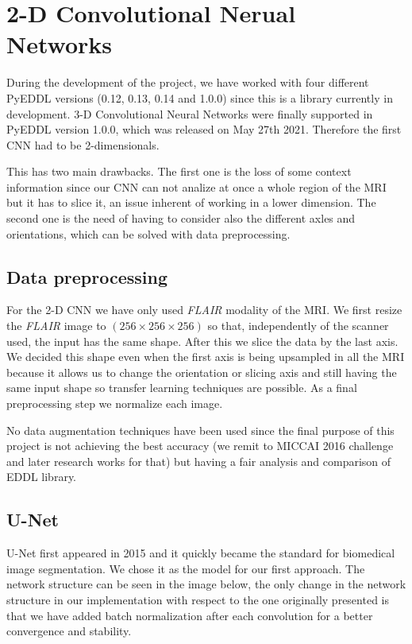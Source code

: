 \chapter{2-D Convolutional Nerual Networks}
\label{3.2D_CNN}

During the development of the project, we have worked with four different PyEDDL versions (0.12, 0.13, 0.14 and 1.0.0) since this is a library currently in development. 3-D Convolutional Neural Networks were finally supported in PyEDDL version 1.0.0, which was released on May 27th 2021. Therefore the first CNN had to be 2-dimensionals.

This has two main drawbacks. The first one is the loss of some context information since our CNN can not analize at once a whole region of the MRI but it has to slice it, an issue inherent of working in a lower dimension. The second one is the need of having to consider also the different axles and orientations, which can be solved with data preprocessing.

\section{Data preprocessing}

For the 2-D CNN we have only used \textit{FLAIR} modality of the MRI. We first resize the \textit{FLAIR} image to $(256\times256\times256)$ so that, independently of the scanner used, the input has the same shape. After this we slice the data by the last axis. We decided this shape even when the first axis is being upsampled in all the MRI because it allows us to change the orientation or slicing axis and still having the same input shape so transfer learning techniques are possible. As a final preprocessing step we normalize each image.

No data augmentation techniques have been used since the final purpose of this project is not achieving the best accuracy (we remit to MICCAI 2016 challenge and later research works for that) but having a fair analysis and comparison of EDDL library.


\newpage
\section{U-Net}

U-Net \cite{UNET:2015} first appeared in 2015 and it quickly became the standard for biomedical image segmentation. We chose it as the model for our first approach. The network structure can be seen in the image below, the only change in the network structure in our implementation with respect to the one originally presented is that we have added batch normalization after each convolution for a better convergence and stability.

